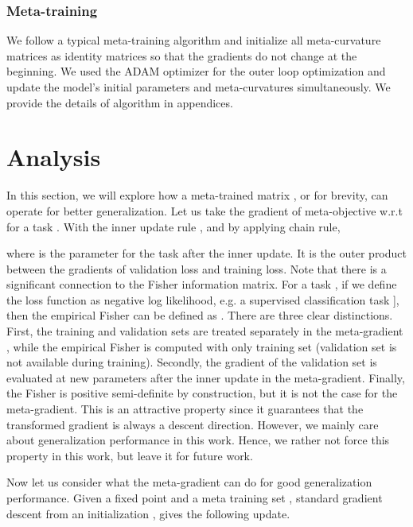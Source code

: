 \documentclass{article}
\begin{document}
\subsubsection{Meta-training}
We follow a typical meta-training algorithm and initialize all meta-curvature matrices as identity matrices so that the gradients do not change at the beginning. We used the ADAM \cite{adam} optimizer for the outer loop optimization and update the model's initial parameters and meta-curvatures simultaneously. We provide the details of algorithm in appendices.


\section{Analysis}
In this section, we will explore how a meta-trained matrix , or  for brevity, can operate for better generalization. Let us take the gradient of meta-objective w.r.t  for a task . With the inner update rule , and by applying chain rule,

where  is the parameter for the task  after the inner update.
It is the outer product between the gradients of validation loss and training loss. Note that there is a significant connection to the Fisher information matrix. For a task , if we define the loss function as negative log likelihood, e.g. a supervised classification task ], then the empirical Fisher can be defined as . There are three clear distinctions. First, the training and validation sets are treated separately in the meta-gradient , while the empirical Fisher is computed with only training set (validation set is not available during training). Secondly, the gradient of the validation set is evaluated at new parameters  after the inner update in the meta-gradient. Finally, the Fisher is positive semi-definite by construction, but it is not the case for the meta-gradient. This is an attractive property since it guarantees that the transformed gradient is always a descent direction. However, we mainly care about generalization performance in this work. Hence, we rather not force this property in this work, but leave it for future work.

Now let us consider what the meta-gradient can do for good generalization performance. Given a fixed point  and a meta training set , standard gradient descent from an initialization , gives the following update.
\setlength{\belowdisplayskip}{2pt} \setlength{\belowdisplayshortskip}{2pt}
\setlength{\abovedisplayskip}{2pt} \setlength{\abovedisplayshortskip}{2pt}
\end{document}
